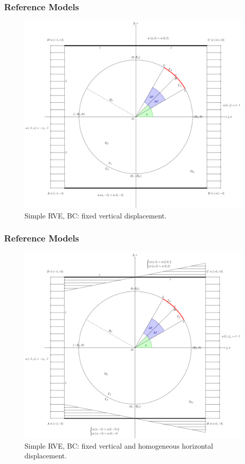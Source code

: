\documentclass[first,firstsupp,lastsupp,handout,last,hyperref,table]{ETHclass}
\begin{document}
\begin{frame}
\frametitle{\small Reference Models}
\vspace{-0.25cm}
\centering
\begin{figure}
\centering
\includegraphics[height=0.7\textheight]{LEFM2DsRVEsFsDdepverdispBCULappAxialDispLR.pdf}
\caption{\scriptsize Simple RVE, BC: fixed vertical displacement.}
\label{fig:singleRVE-rigid}
\end{figure}
\end{frame}

\begin{frame}
\frametitle{\small Reference Models}
\vspace{-0.25cm}
\centering
\begin{figure}
\centering
\includegraphics[height=0.7\textheight]{LEFM2DsRVEsFsDhomoBCULappAxialDispLR.pdf}
\caption{\scriptsize Simple RVE, BC: fixed vertical and homogeneous horizontal displacement.}
\label{fig:singleRVE-homo}
\end{figure}
\end{frame}
\end{document}
